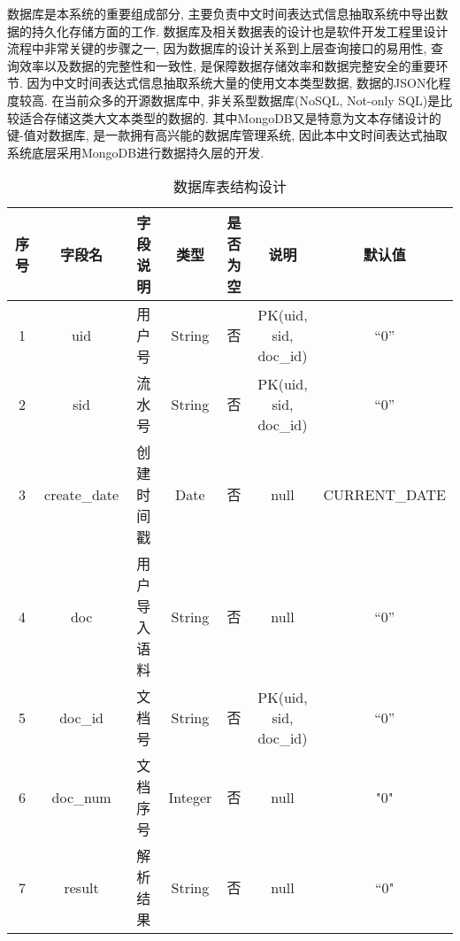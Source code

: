 数据库是本系统的重要组成部分, 主要负责中文时间表达式信息抽取系统中导出数据的持久化存储方面的工作.
数据库及相关数据表的设计也是软件开发工程里设计流程中非常关键的步骤之一, 因为数据库的设计关系到上层查询接口的易用性, 查询效率以及数据的完整性和一致性, 是保障数据存储效率和数据完整安全的重要环节.
因为中文时间表达式信息抽取系统大量的使用文本类型数据, 数据的JSON化程度较高. 在当前众多的开源数据库中, 非关系型数据库(NoSQL, Not-only SQL)是比较适合存储这类大文本类型的数据的.
其中MongoDB又是特意为文本存储设计的键-值对数据库, 是一款拥有高兴能的数据库管理系统, 因此本中文时间表达式抽取系统底层采用MongoDB进行数据持久层的开发.

\begin{table}[h]
  \centering
  \caption{数据库表结构设计}
  \begin{tabular}{|*{7}{c|}}
    \hline
    序号 & 字段名          & 字段说明                 & 类型    & \makecell*[c]{是否                                              \\为空} & 说明                  & 默认值        \\
    \hline
    1    & uid             & 用户号                   & String  & 否                 & \makecell*[c]{PK(uid, sid,                 \\doc\_id)} & “0”           \\
    \hline
    2    & sid             & 流水号                   & String  & 否                 & \makecell*[c]{PK(uid, sid,                 \\doc\_id)} & “0”           \\
    \hline
    3    & create\_date    & 创建时间戳               & Date    & 否                 & null                       & CURRENT\_DATE \\
    \hline
    4    & doc             & \makecell*[c]{用户                                                                                   \\导入语料} & String  & 否       & null                  & “0”           \\
    \hline
    5    & doc\_id         & 文档号                   & String  & 否                 & \makecell*[c]{PK(uid, sid,                 \\doc\_id)} & “0”           \\
    \hline
    6    & doc\_num        & 文档序号                 & Integer & 否                 & null                       & "0"           \\
    \hline
    7    & result          & 解析结果                 & String  & 否                 & null                       & “0"           \\

\end{tabular}
\end{table}
